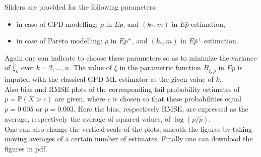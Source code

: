 \documentclass[twoside,leqno,11pt]{article}
\begin{document}
 
 \noindent
Sliders are provided for the following parameters:
 \begin{itemize}
 \item in case of GPD modelling: $\tilde\rho$ in $Ep$, and  $(k_*,m)$ in $E{\bar p}$ estimation,
 \item in case of Pareto modelling: $\rho$ in $Ep^+$, and $(k_*,m)$ in $E{\bar p}^+$ estimation.
   \end{itemize}
  Again one can indicate to choose these parameters so as to minimize  the variance of $\hat{\xi}_k$ over $k=2,\ldots,n$.  
 The value of $\xi$ in the parametric function $B_{\xi,\tilde\rho}$ in $Ep$ is imputed with the classical GPD-ML estimator at the given value of $k$.
\\
Also bias and RMSE plots of the corresponding tail probability estimates of $p=\mathbb{P}(X>c)$ are given, where $c$ is chosen so that these probabilities equal $p=0.005$ or $p=0.003$. Here the bias, respectively RMSE, are expressed as the average, respectively the average of squared values, of $\log (p/\hat{p})$.  
 \\ One can also change the vertical scale of the plots, smooth the figures by taking moving averages of a certain number of estimates. Finally one can download the figures in pdf. \\
  
  
  
\end{document}
